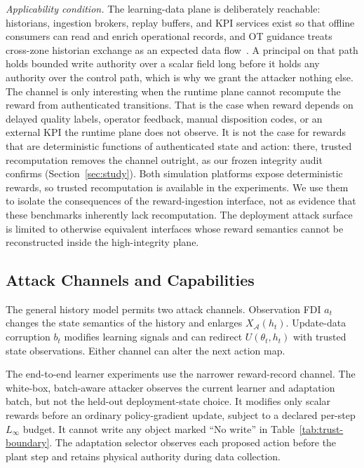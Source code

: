\emph{Applicability condition.}  The learning-data plane is deliberately
reachable: historians, ingestion brokers, replay buffers, and KPI services
exist so that offline consumers can read and enrich operational records, and
OT guidance treats cross-zone historian exchange as an expected data
flow~\cite{nist_ot_security_2023,mitre_data_historian}.  A principal on that
path holds bounded write authority over a scalar field long before it holds
any authority over the control path, which is why we grant the attacker
nothing else.  The channel is only interesting when the runtime plane cannot
recompute the reward from authenticated transitions.  That is the case when
reward depends on delayed quality labels, operator feedback, manual
disposition codes, or an external KPI the runtime plane does not observe.  It
is not the case for rewards that are deterministic functions of authenticated
state and action: there, trusted recomputation removes the channel outright,
as our frozen integrity audit confirms (Section~\ref{sec:study}).  Both
simulation platforms expose deterministic rewards, so trusted recomputation is
available in the experiments.  We use them to isolate the consequences of the
reward-ingestion interface, not as evidence that these benchmarks inherently
lack recomputation.  The deployment attack surface is limited to otherwise
equivalent interfaces whose reward semantics cannot be reconstructed inside
the high-integrity plane.

\subsection{Attack Channels and Capabilities}

The general history model permits two attack channels.  Observation FDI
$a_t$ changes the state semantics of the history and enlarges
$X_{\mathcal A}(h_t)$.  Update-data corruption $b_t$ modifies learning signals
and can redirect $U(\theta_t,h_t)$ with trusted state observations.  Either
channel can alter the next action map.

The end-to-end learner experiments use the narrower reward-record channel.
The white-box, batch-aware attacker observes the current learner and
adaptation batch, but not the held-out deployment-state choice.  It modifies
only scalar rewards before an ordinary policy-gradient update, subject to a
declared per-step $L_\infty$ budget.  It cannot write any object marked ``No write'' in
Table~\ref{tab:trust-boundary}.  The adaptation
selector observes each proposed action before the plant step and retains
physical authority during data collection.

